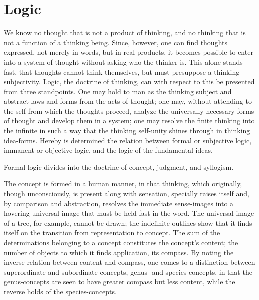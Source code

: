 \documentclass[12pt]{book}
\begin{document}
\section{Logic}
\label{sec:11}

\noindent We know no thought that is not a product of thinking, and no thinking
that is not a function of a thinking being. Since, however, one can find
thoughts expressed, not merely in words, but in real products, it becomes
possible to enter into a system of thought without asking who the thinker is.
This alone stands fast, that thoughts cannot think themselves, but must
presuppose a thinking subjectivity. Logic, the doctrine of thinking, can with
respect to this be presented from three standpoints. One may hold to man as the
thinking subject and abstract laws and forms from the acts of thought; one may,
without attending to the self from which the thoughts proceed, analyze the
universally necessary forms of thought and develop them in a system; one may
resolve the finite thinking into the infinite in such a way that the thinking
self-unity shines through in thinking idea-forms. Hereby is determined the
relation between formal or subjective logic, immanent or objective logic, and the
logic of the fundamental ideas.

Formal logic divides into the doctrine of concept, judgment, and syllogism.

The concept is formed in a human manner, in that thinking, which originally,
though unconsciously, is present along with sensation, specially raises itself
and, by comparison and abstraction, resolves the immediate sense-images into a
hovering universal image that must be held fast in the word. The universal image
of a tree, for example, cannot be drawn; the indefinite outlines show that it
finds itself on the transition from representation to concept. The sum of the
determinations belonging to a concept constitutes the concept's content; the
number of objects to which it finds application, its compass. By noting the
inverse relation between content and compass, one comes to a distinction between
superordinate and subordinate concepts, genus- and species-concepts, in that the
genus-concepts are seen to have greater compass but less content, while the
reverse holds of the species-concepts.
\end{document}
